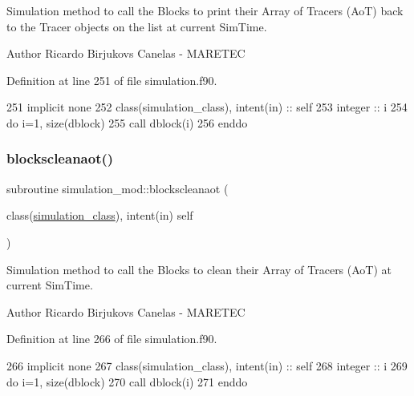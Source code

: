 Simulation method to call the Blocks to print their Array of Tracers (AoT) back to the Tracer objects on the list at current Sim\+Time. 

\begin{DoxyAuthor}{Author}
Ricardo Birjukovs Canelas -\/ M\+A\+R\+E\+T\+EC 
\end{DoxyAuthor}


Definition at line 251 of file simulation.\+f90.


\begin{DoxyCode}
251         \textcolor{keywordtype}{implicit none}
252         \textcolor{keywordtype}{class}(simulation\_class), \textcolor{keywordtype}{intent(in)} :: self        
253         \textcolor{keywordtype}{integer} :: i
254         \textcolor{keywordflow}{do} i=1, \textcolor{keyword}{size}(dblock)
255             \textcolor{keyword}{call }dblock(i)%
256 \textcolor{keywordflow}{        enddo}
\end{DoxyCode}
\mbox{\label{namespacesimulation__mod_a9c7e093e5cf65d3414f9a8cf8beab611}} 
\subsubsection{\texorpdfstring{blockscleanaot()}{blockscleanaot()}}
{\footnotesize\ttfamily subroutine simulation\+\_\+mod\+::blockscleanaot (\begin{DoxyParamCaption}\item[{class(\mbox{\hyperlink{structsimulation__mod_1_1simulation__class}{simulation\+\_\+class}}), intent(in)}]{self }\end{DoxyParamCaption})\hspace{0.3cm}{\ttfamily [private]}}



Simulation method to call the Blocks to clean their Array of Tracers (AoT) at current Sim\+Time. 

\begin{DoxyAuthor}{Author}
Ricardo Birjukovs Canelas -\/ M\+A\+R\+E\+T\+EC 
\end{DoxyAuthor}


Definition at line 266 of file simulation.\+f90.


\begin{DoxyCode}
266         \textcolor{keywordtype}{implicit none}
267         \textcolor{keywordtype}{class}(simulation\_class), \textcolor{keywordtype}{intent(in)} :: self        
268         \textcolor{keywordtype}{integer} :: i
269         \textcolor{keywordflow}{do} i=1, \textcolor{keyword}{size}(dblock)
270             \textcolor{keyword}{call }dblock(i)%
271 \textcolor{keywordflow}{        enddo}
\end{DoxyCode}
\mbox{\label{namespacesimulation__mod_ac838d4afe33303dc49a5790ca957baa1}} 
